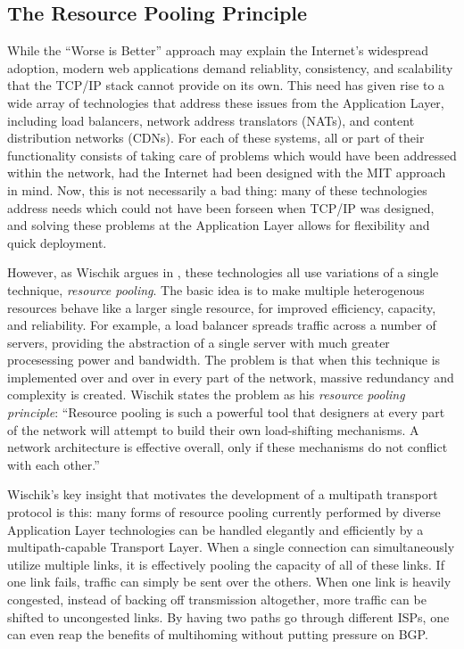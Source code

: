 \subsection{The Resource Pooling Principle}
\label{sec:pooling}
While the ``Worse is Better'' approach may explain the Internet's widespread adoption, modern web applications demand reliablity, consistency, and scalability that the TCP/IP stack cannot provide on its own. This need has given rise to a wide array of technologies that address these issues from the Application Layer, including load balancers, network address translators (NATs), and content distribution networks (CDNs). For each of these systems, all or part of their functionality consists of taking care of problems which would have been addressed within the network, had the Internet had been designed with the MIT approach in mind. Now, this is not necessarily a bad thing: many of these technologies address needs which could not have been forseen when TCP/IP was designed, and solving these problems at the Application Layer allows for flexibility and quick deployment. 

However, as Wischik argues in \cite{wischik2008resource}, these technologies all use variations of a single technique, \emph{resource pooling}. The basic idea is to make multiple heterogenous resources behave like a larger single resource, for improved efficiency, capacity, and reliability. For example, a load balancer spreads traffic across a number of servers, providing the abstraction of a single server with much greater procesessing power and bandwidth. The problem is that when this technique is implemented over and over in every part of the network, massive redundancy and complexity is created. Wischik states the problem as his \emph{resource pooling principle}: ``Resource pooling is such a powerful tool that designers at every part of the network will attempt to build their own load-shifting mechanisms. A network architecture is effective overall, only if these mechanisms do not conflict with each other.''\cite{wischik2008resource} 

Wischik's key insight that motivates the development of a multipath transport protocol is this: many forms of resource pooling currently performed by diverse Application Layer technologies can be handled elegantly and efficiently by a multipath-capable Transport Layer. When a single connection can simultaneously utilize multiple links, it is effectively pooling the capacity of all of these links. If one link fails, traffic can simply be sent over the others. When one link is heavily congested, instead of backing off transmission altogether, more traffic can be shifted to uncongested links. By having two paths go through different ISPs, one can even reap the benefits of multihoming without putting pressure on BGP.